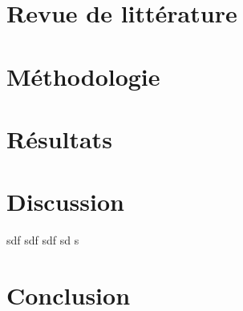 \documentclass[12pt]{article}
\begin{document}
\newpage
\section{Revue de littérature}

\newpage
\section{Méthodologie}

\newpage
\section{Résultats}

\newpage
\section{Discussion}

sdf \parencite{Coussy} sdf \parencite{BRUNO2020724} sdf \parencite{Numba2015} sd \parencite{diamond2016cvxpy} s \parencite{bib:Domahidi2013ecos}

\newpage 
{}
\section*{Conclusion}

\newpage
\renewcommand\refname{\centering Bibliographie}
\printbibliography
% 
% 
\end{document}
